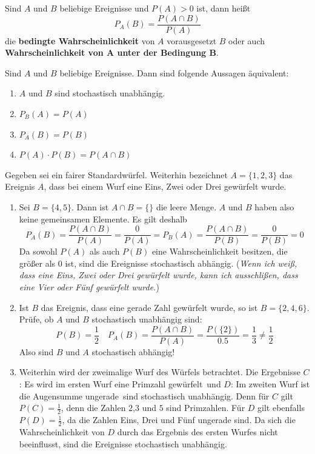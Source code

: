 \documentclass[ngerman, 12pt]{nssheetxea}
\begin{document}
\begin{definition}
Sind $A$ und $B$ beliebige Ereignisse und $P(A)>0$ ist, dann heißt
\[ P_A(B)= \dfrac{P(A \cap B)}{P(A)}\]
die \textbf{bedingte Wahrscheinlichkeit} von $A$ vorausgesetzt $B$ oder auch \textbf{Wahrscheinlichkeit von $\mathbf{A}$ unter der Bedingung $\mathbf{B}$}.
\end{definition}

\begin{theorem}
Sind $A$ und $B$ beliebige Ereignisse. Dann sind folgende Aussagen äquivalent:
\begin{enumerate}
\item $A$ und $B$ sind stochastisch unabhängig.
\item $P_B(A)=P(A)$
\item $P_A(B)=P(B)$
\item $P(A) \cdot P(B) = P(A\cap B)$
\end{enumerate}
\end{theorem}

\begin{example}
Gegeben sei ein fairer Standardwürfel. Weiterhin bezeichnet $A=\{1,2,3\}$ das Ereignis $A$, dass bei einem Wurf eine Eins, Zwei oder Drei gewürfelt wurde.
\begin{enumerate}
\item Sei $B=\{4,5\}$. Dann ist $A\cap B = \{ \}$ die leere Menge. $A$ und $B$ haben also keine gemeinsamen Elemente. Es gilt deshalb
\[ P_A(B) = \dfrac{P(A\cap B)}{P(A)} = \dfrac{0}{P(A)} = P_B(A) = \dfrac{P(A\cap B)}{P(B)} = \dfrac{0}{P(B)} = 0 \]
Da sowohl $P(A)$ als auch $P(B)$ eine Wahrscheinlichkeit besitzen, die größer als $0$ ist, sind die Ereignisse stochastisch abhängig. (\textit{Wenn ich weiß, dass eine Eins, Zwei oder Drei gewürfelt wurde, kann ich ausschlißen, dass eine Vier oder Fünf gewürfelt wurde.})
\item Ist $B$ das Ereignis, dass eine gerade Zahl gewürfelt wurde, so ist $B=\{2,4,6\}$. Prüfe, ob $A$ und $B$ stochastisch unabhängig sind:
\[ P(B)=\dfrac{1}{2} \quad P_A(B) = \dfrac{P(A\cap B)}{P(A)} = \dfrac{P(\{ 2\}) }{\num{0,5}} = \dfrac{1}{3} \neq \dfrac{1}{2}\]
Also sind $B$ und $A$ stochastisch abhängig!
\item Weiterhin wird der zweimalige Wurf des Würfels betrachtet. Die Ergebnisse $C$: \glqq Es wird im ersten Wurf eine Primzahl gewürfelt\grqq \ und $D$: \glqq Im zweiten Wurf ist die Augensumme ungerade\grqq \ sind stochastisch unabhängig. Denn für $C$ gilt $P(C)=\frac{1}{2}$, denn die Zahlen $2$,$3$ und $5$ sind Primzahlen. Für $D$ gilt ebenfalls $P(D)=\frac{1}{2}$, da die Zahlen Eins, Drei und Fünf ungerade sind. Da sich die Wahrscheinlichkeit von $D$ durch das Ergebnis des ersten Wurfes nicht beeinflusst, sind die Ereignisse stochastisch unabhängig.
\end{enumerate}
\end{example}
\end{document}
